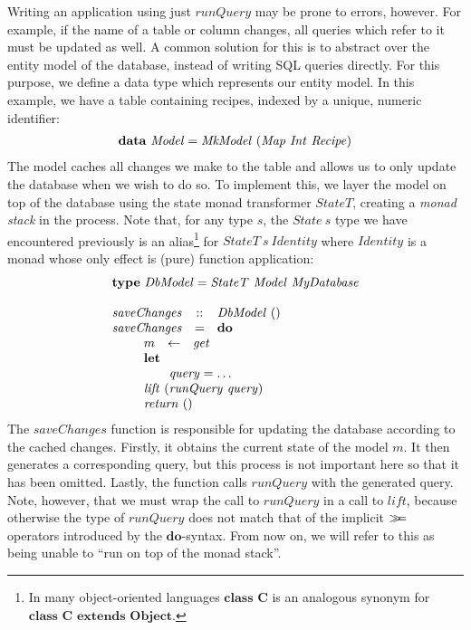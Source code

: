 Writing an application using just $\mathit{runQuery}$ may be prone to errors, however. For example, if the name of a table or column changes, all queries which refer to it must be updated as well. A common solution for this is to abstract over the entity model of the database, instead of writing SQL queries directly. For this purpose, we define a data type which represents our entity model. In this example, we have a table containing recipes, indexed by a unique, numeric identifier:
\begin{displaymath}
\begin{array}{lcl}
\multicolumn{3}{l}{\mathbf{data}~\mathit{Model} = \mathit{MkModel}~(\mathit{Map}~\mathit{Int}~\mathit{Recipe})}
\end{array}
\end{displaymath}
The model caches all changes we make to the table and allows us to only update the database when we wish to do so. To implement this, we layer the model on top of the database using the state monad transformer $\mathit{StateT}$, creating a \emph{monad stack} in the process. Note that, for any type $s$, the $\mathit{State}~s$ type we have encountered previously is an alias\footnote{
In many object-oriented languages $\textbf{class C}$ is an analogous
synonym for $\textbf{class C extends Object}$.
}
for $\mathit{StateT}~s~\mathit{Identity}$ where $\mathit{Identity}$ is a monad
whose only effect is (pure) function application:
\begin{displaymath}
\begin{array}{lcl}
\multicolumn{3}{l}{\mathbf{type}~\mathit{DbModel} = \mathit{StateT}~\mathit{Model}~\mathit{MyDatabase}}\\\\
\mathit{saveChanges} & :: & \mathit{DbModel}~() \\
\mathit{saveChanges} & = & \mathbf{do} \\
\multicolumn{3}{l}{\qquad \begin{array}{lcl}
    m & \leftarrow & \mathit{get} \\
    \multicolumn{3}{l}{\mathbf{let}} \\
    \multicolumn{3}{l}{\qquad \mathit{query} = \ldots} \\
    \multicolumn{3}{l}{\mathit{lift}~(\mathit{runQuery}~\mathit{query})}\\
    \multicolumn{3}{l}{\mathit{return}~()}
\end{array} }
\end{array}
\end{displaymath}
The $\mathit{saveChanges}$ function is responsible for updating the database according to the cached changes. Firstly, it obtains the current state of the model $m$. It then generates a corresponding query, but this process is not important here so that it has been omitted. Lastly, the function calls $\mathit{runQuery}$ with the generated query. Note, however, that we must wrap the call to $\mathit{runQuery}$ in a call to $\mathit{lift}$, because otherwise the type of $\mathit{runQuery}$ does not match that of the implicit $\gg\!\!=$ operators introduced
by the $\mathbf{do}$-syntax.
From now on, we will refer to this as being unable to ``run on top of the monad stack''.

